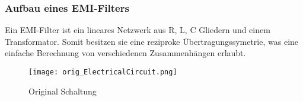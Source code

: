 \subsubsection{Aufbau eines EMI-Filters} \label{subsubsec:emi_filter}
Ein EMI-Filter ist ein lineares Netzwerk aus R, L, C Gliedern und einem Transformator. Somit besitzen sie eine reziproke Übertragungssymetrie, was eine einfache Berechnung von verschiedenen Zusammenhängen erlaubt. 



\begin{figure}[H]
	\centering
	\texttt{[image: orig\_ElectricalCircuit.png]}
	\caption{Original Schaltung \cite{aufgabenstellung}}
	\label{fig:orig_Schaltung}
\end{figure}
